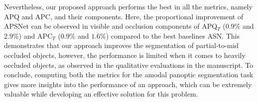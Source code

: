 \documentclass[10pt,twocolumn,letterpaper]{article}
\begin{document}
Nevertheless, our proposed approach performs the best in all the metrics, namely APQ and APC, and their components. Here, the proportional improvement of APSNet can be observed in visible and occlusion components of APQ${_T}$ ($0.9\%$ and $2.9\%$) and APC${_T}$ ($0.9\%$ and $1.6\%$) compared to the best baselines ASN. This demonstrates that our approach improves the segmentation of partial-to-mid occluded objects, however, the performance is limited when it comes to heavily occluded objects, as observed in the qualitative evaluations in the manuscript. To conclude, computing both the metrics for the amodal panoptic segmentation task gives more insights into the performance of an approach, which can be extremely valuable while developing an effective solution for this problem.
\end{document}
